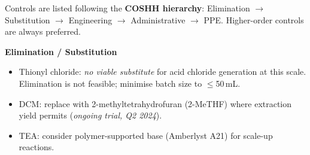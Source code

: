 
\newpage


\vspace{4pt}

{\small Controls are listed following the \textbf{COSHH hierarchy}: Elimination
$\rightarrow$ Substitution $\rightarrow$ Engineering $\rightarrow$
Administrative $\rightarrow$ PPE. Higher-order controls are always preferred.}

\vspace{6pt}

\noindent
\begin{minipage}[t]{0.48\linewidth}
  \begin{tcolorbox}[
    colback=NavyDeep!8, colframe=NavyDeep, boxrule=1pt,
    arc=4pt, left=8pt, right=8pt, top=6pt, bottom=6pt
  ]
    \textbf{\textcolor{NavyDeep}{\faTimesCircle\quad Elimination / Substitution}}

    \vspace{4pt}
    \begin{itemize}[leftmargin=*, itemsep=2pt, topsep=2pt]
      \item Thionyl chloride: \textit{no viable substitute} for acid chloride
            generation at this scale. Elimination is not feasible; minimise
            batch size to $\leq$50\,mL.
      \item DCM: replace with 2-methyltetrahydrofuran (2-MeTHF) where
            extraction yield permits (\textit{ongoing trial, Q2 2024}).
      \item TEA: consider polymer-supported base (Amberlyst A21) for
            scale-up reactions.
    \end{itemize}
  \end{tcolorbox}
\end{minipage}%
\hfill
